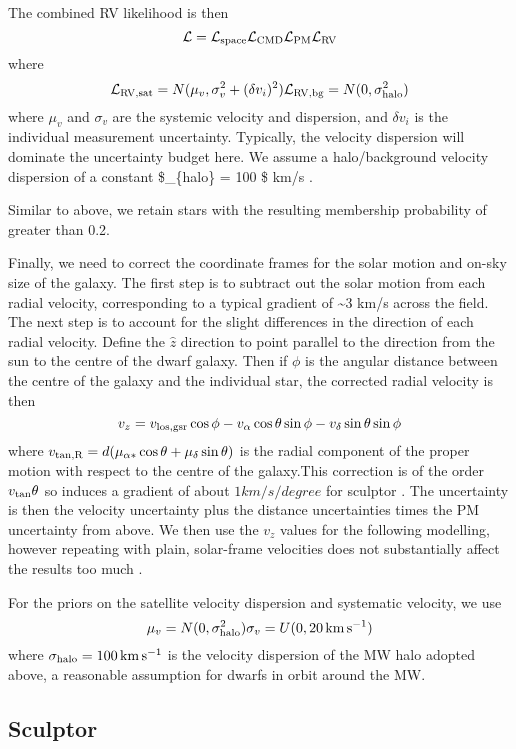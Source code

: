 The combined RV likelihood is then \[
{\cal L} = {\cal L}_{\rm space} {\cal L}_{\rm CMD} {\cal L}_{\rm PM} {\cal L}_{\rm RV}
\] where \[
{\cal L}_{\rm RV, sat} = N(\mu_{v}, \sigma_{v}^2 + (\delta v_i)^2) \\
{\cal L}_{\rm RV, bg} = N(0, \sigma_{\rm halo}^2)
\] where \(\mu_v\) and \(\sigma_v\) are the systemic velocity and
dispersion, and \(\delta v_i\) is the individual measurement
uncertainty. Typically, the velocity dispersion will dominate the
uncertainty budget here. We assume a halo/background velocity dispersion
of a constant \$\sigma\_\{\rm halo\} = 100 \$ km/s
\citep[e.g.][]{brown+2010}.

Similar to above, we retain stars with the resulting membership
probability of greater than 0.2.

Finally, we need to correct the coordinate frames for the solar motion
and on-sky size of the galaxy. The first step is to subtract out the
solar motion from each radial velocity, corresponding to a typical
gradient of \textasciitilde3 km/s across the field. The next step is to
account for the slight differences in the direction of each radial
velocity. Define the \(\hat z\) direction to point parallel to the
direction from the sun to the centre of the dwarf galaxy. Then if
\(\phi\) is the angular distance between the centre of the galaxy and
the individual star, the corrected radial velocity is then \[
v_z = v_{\rm los, gsr}\cos\phi  - v_{\alpha}\cos\theta \sin\phi - v_\delta \sin\theta\sin\phi
\] where
\(v_{\rm tan, R} = d(\mu_{\alpha*}\cos\theta + \mu_\delta \sin \theta)\)
is the radial component of the proper motion with respect to the centre
of the galaxy.This correction is of the order \(v_{\rm tan}\theta\) so
induces a gradient of about \(1 km/s/degree\) for sculptor
\citep[see][]{WMO2008}. The uncertainty is then the velocity uncertainty
plus the distance uncertainties times the PM uncertainty from above. We
then use the \(v_z\) values for the following modelling, however
repeating with plain, solar-frame velocities does not substantially
affect the results too much .

For the priors on the satellite velocity dispersion and systematic
velocity, we use \[
\mu_{v} = N(0, \sigma_{\rm halo}^2) \\
\sigma_{v} = U(0, 20\,{\rm km\,s^{-1}})
\] where \(\sigma_{\rm halo} = 100\,{\rm km\,s^{-1}}\) is the velocity
dispersion of the MW halo adopted above, a reasonable assumption for
dwarfs in orbit around the MW.

\subsection{Sculptor}\label{sculptor}

